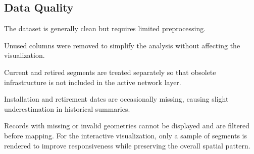 \subsection{Data Quality}

The dataset is generally clean but requires limited preprocessing.

Unused columns were removed to simplify the analysis without affecting the visualization.

Current and retired segments are treated separately so that obsolete infrastructure is not included in the active network layer.

Installation and retirement dates are occasionally missing, causing slight underestimation in historical summaries.

Records with missing or invalid geometries cannot be displayed and are filtered before mapping. For the interactive visualization, only a sample of segments is rendered to improve responsiveness while preserving the overall spatial pattern.

